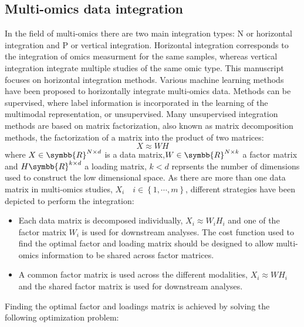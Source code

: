 \documentclass[../main.tex]{subfiles}
\begin{document}


	\subsection{Multi-omics data integration}
		In the field of multi-omics there are two main integration types: N or horizontal integration and P or vertical integration. 
		Horizontal integration corresponds to the integration of omics measurment for the same samples, whereas vertical integration integrate multiple studies of the same omic type. 
		This manuscript focuses on horizontal integration methods. 
		Various machine learning methods have been proposed to horizontally integrate multi-omics data. 
		Methods can be supervised, where label information is incorporated in the learning of the multimodal representation, or unsupervised. 
		Many unsupervised integration methods are based on matrix factorization, also known as matrix decomposition methods, the factorization of a matrix into the product of two matrices:
		\begin{equation}
			X \approx WH
		\end{equation}
		where \(X \in \symbb{R}^{N\times d}\) is a data matrix,\(W \in \symbb{R}^{N\times k}\) a factor matrix and \(H \symbb{R}^{k\times d}\) a loading matrix, \(k < d\) reprsents the number of dimensions used to construct the low dimensional space. 
		As there are more than one data matrix in multi-omics studies, \(X_i\quad i \in \left\{1, \cdots, m\right\}\), different strategies have been depicted to perform the integration:
		\begin{itemize}[nosep]
			\item Each data matrix is decomposed individually, \(X_i \approx W_iH_i\) and one of the factor matrix \(W_i\) is used for downstream analyses. The cost function used to find the optimal factor and loading matrix should be designed to allow multi-omics information to be shared across factor matrices. 
			\item A common factor matrix is used across the different modalities, \(X_i \approx WH_i\) and the shared factor matrix is used for downstream analyses. 
		\end{itemize}
		Finding the optimal factor and loadings matrix is achieved by solving the following optimization problem: 
\end{document}
